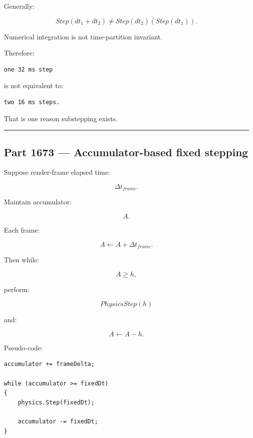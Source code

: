 \hypertarget{06-engine-ii-ch037-nonlinear-systems-are-especially-sensitive}{}

Generally:

\[
Step(dt_1+dt_2)
\neq
Step(dt_2)(Step(dt_1)).
\]

Numerical integration is not time-partition invariant.

Therefore:

\begin{verbatim}
one 32 ms step
\end{verbatim}

is not equivalent to:

\begin{verbatim}
two 16 ms steps.
\end{verbatim}

That is one reason substepping exists.

\begin{center}\rule{0.5\linewidth}{0.5pt}\end{center}

\subsection{Part 1673 --- Accumulator-based fixed stepping}\label{06-engine-ii-ch037-part-1673-accumulator-based-fixed-stepping}

\hypertarget{06-engine-ii-ch037-part-1673-accumulator-based-fixed-stepping}{}

Suppose render-frame elapsed time:

\[
\Delta t_{frame}.
\]

Maintain accumulator:

\[
A.
\]

Each frame:

\[
A\leftarrow A+\Delta t_{frame}.
\]

Then while:

\[
A\ge h,
\]

perform:

\[
PhysicsStep(h)
\]

and:

\[
A\leftarrow A-h.
\]

Pseudo-code:

\begin{verbatim}
accumulator += frameDelta;

while (accumulator >= fixedDt)
{
    physics.Step(fixedDt);

    accumulator -= fixedDt;
}
\end{verbatim}

